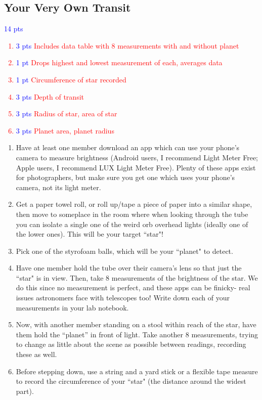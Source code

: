 \documentclass[11pt]{article}
\begin{document}
\subsection{Your Very Own Transit}
\noindent
\textcolor{blue}{14 pts}
\textcolor{red}{
\begin{enumerate}
    \item \textcolor{blue}{3 pts} Includes data table with 8 measurements with and without planet
    \item \textcolor{blue}{1 pt} Drops highest and lowest measurement of each, averages data
    \item \textcolor{blue}{1 pt} Circumference of star recorded
    \item \textcolor{blue}{3 pts} Depth of transit
    \item \textcolor{blue}{3 pts} Radius of star, area of star
    \item \textcolor{blue}{3 pts} Planet area, planet radius
\end{enumerate}}

\begin{enumerate}[label=Step \arabic*:]
    \item Have at least one member download an app which can use your phone’s camera to measure brightness (Android users, I recommend Light Meter Free; Apple users, I recommend LUX Light Meter Free). Plenty of these apps exist for photographers, but make sure you get one which uses your phone’s camera, not its light meter.
    
    \item Get a paper towel roll, or roll up/tape a piece of paper into a similar shape, then move to someplace in the room where when looking through the tube you can isolate a single one of the weird orb overhead lights (ideally one of the lower ones). This will be your target ``star"!
    
    \item Pick one of the styrofoam balls, which will be your ``planet" to detect.
    
    \item Have one member hold the tube over their camera’s lens so that just the ``star" is in view. Then, take 8 measurements of the brightness of the star. We do this since no measurement is perfect, and these apps can be finicky- real issues astronomers face with telescopes too! Write down each of your measurements in your lab notebook.
    
    \item Now, with another member standing on a stool within reach of the star, have them hold the “planet” in front of light. Take another 8 measurements, trying to change as little about the scene as possible between readings, recording these as well.
    
    \item Before stepping down, use a string and a yard stick or a flexible tape measure to record the circumference of your ``star" (the distance around the widest part).
\end{enumerate}
\end{document}

